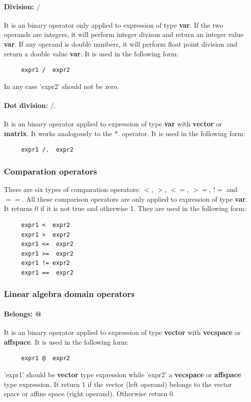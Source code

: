 \documentclass[12pt]{article} %
\begin{document}
\paragraph{Division: $/$ }
It is an binary operator only  applied to expression of type \textbf{var}. If  the two operands are integers, it will perform integer divison and return an integer value \textbf{var}. If any operand is double numbers, it will perform float point division and return a double  value   \textbf{var}.  It is used in the following form:
\begin{lstlisting}
     expr1 /  expr2
\end{lstlisting}
In any case  'expr2' should not be zero.

\paragraph{Dot division: $/.$}
It is an binary operator applied to expression of type  \textbf{var} with \textbf{vector} or \textbf{matrix}. It works analogously to the *.  operator. It is used in the following form: 
\begin{lstlisting}
     expr1 /.  expr2
\end{lstlisting}

\subsubsection{Comparation operators}
 There are six types of comparation operators:  $<$, $>$, $<=$, $>=$, $!=$ and $==$. 
All these comparison operators are only applied to expression of type  \textbf{var}.  It  returns 0 if it is not true and otherwise 1. They are used in the following form:
\begin{lstlisting}
     expr1 <  expr2
     expr1 >  expr2
     expr1 <=  expr2
     expr1 >=  expr2
     expr1 != expr2
     expr1 ==  expr2
\end{lstlisting}

\subsubsection{Linear algebra domain operators}
\paragraph{Belongs: @}
It is an binary operator applied to expression of type  \textbf{vector} with \textbf{vecspace} or \textbf{affspace}. It is used in the following form:
\begin{lstlisting}
     expr1 @  expr2
\end{lstlisting}
'expr1' should be \textbf{vector} type expression while 'expr2'  a \textbf{vecspace} or \textbf{affspace} type expression. It return 1 if the  vector (left operand) belongs to the vector space or affine space (right operand). Otherwise return 0. 
 
\end{document}
